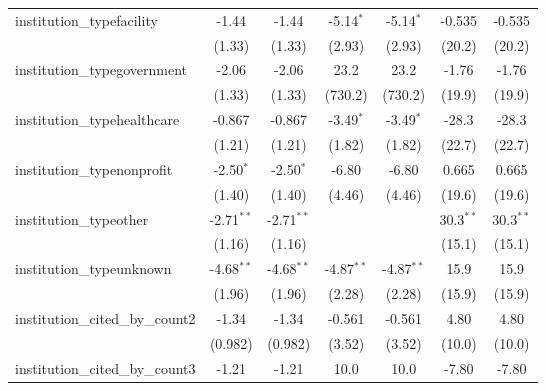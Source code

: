\begin{tabular}{lcccccc}
   institution\_typefacility             & -1.44         & -1.44         & -5.14$^{*}$   & -5.14$^{*}$   & -0.535        & -0.535\\   
                                         & (1.33)        & (1.33)        & (2.93)        & (2.93)        & (20.2)        & (20.2)\\   
   institution\_typegovernment           & -2.06         & -2.06         & 23.2          & 23.2          & -1.76         & -1.76\\   
                                         & (1.33)        & (1.33)        & (730.2)       & (730.2)       & (19.9)        & (19.9)\\   
   institution\_typehealthcare           & -0.867        & -0.867        & -3.49$^{*}$   & -3.49$^{*}$   & -28.3         & -28.3\\   
                                         & (1.21)        & (1.21)        & (1.82)        & (1.82)        & (22.7)        & (22.7)\\   
   institution\_typenonprofit            & -2.50$^{*}$   & -2.50$^{*}$   & -6.80         & -6.80         & 0.665         & 0.665\\   
                                         & (1.40)        & (1.40)        & (4.46)        & (4.46)        & (19.6)        & (19.6)\\   
   institution\_typeother                & -2.71$^{**}$  & -2.71$^{**}$  &               &               & 30.3$^{**}$   & 30.3$^{**}$\\   
                                         & (1.16)        & (1.16)        &               &               & (15.1)        & (15.1)\\   
   institution\_typeunknown              & -4.68$^{**}$  & -4.68$^{**}$  & -4.87$^{**}$  & -4.87$^{**}$  & 15.9          & 15.9\\   
                                         & (1.96)        & (1.96)        & (2.28)        & (2.28)        & (15.9)        & (15.9)\\   
   institution\_cited\_by\_count2        & -1.34         & -1.34         & -0.561        & -0.561        & 4.80          & 4.80\\   
                                         & (0.982)       & (0.982)       & (3.52)        & (3.52)        & (10.0)        & (10.0)\\   
   institution\_cited\_by\_count3        & -1.21         & -1.21         & 10.0          & 10.0          & -7.80         & -7.80\\   

\end{tabular}
